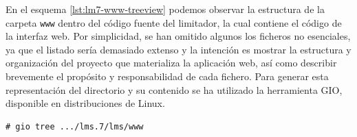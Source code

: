 En el esquema \ref{lst:lm7-www-treeview} podemos observar la estructura de la carpeta \verb|www| dentro del código fuente del limitador, la cual contiene el código de la interfaz web. Por simplicidad, se han omitido algunos los ficheros no esenciales, ya que el listado sería demasiado extenso y la intención es mostrar la estructura y organización del proyecto que materializa la aplicación web, así como describir brevemente el propósito y responsabilidad de cada fichero. Para generar esta representación del directorio y su contenido se ha utilizado la herramienta \acrshort{GIO}, disponible en distribuciones de Linux.\newline

\begin{lstlisting}[label={lst:lm7-www-treeview}, caption={Estructura de directorios y ficheros de la interfaz web}]
    # gio tree .../lms.7/lms/www


\end{lstlisting}
